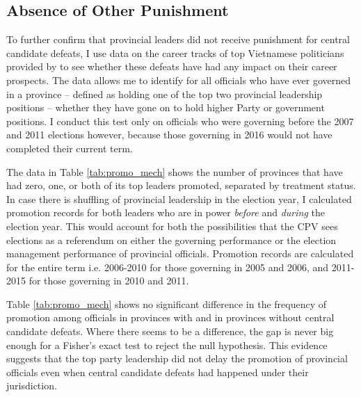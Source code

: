 \documentclass[12pt]{article}
\newcommand{\1}{\mathbbm{1}}
\begin{document}
\subsection{Absence of Other Punishment}

To further confirm that provincial leaders did not receive punishment for central candidate defeats, I use data on the career tracks of top Vietnamese politicians provided by \citet{MaleskyPhan2017} to see whether these defeats have had any impact on their career prospects. The data allows me to identify for all officials who have ever governed in a province -- defined as holding one of the top two provincial leadership positions -- whether they have gone on to hold higher Party or government positions. I conduct this test only on officials who were governing before the 2007 and 2011 elections however, because those governing in 2016 would not have completed their current term.

The data in Table \ref{tab:promo_mech} shows the number of provinces that have had zero, one, or both of its top leaders promoted, separated by treatment status. In case there is shuffling of provincial leadership in the election year, I calculated promotion records for both leaders who are in power \textit{before} and \textit{during} the election year. This would account for both the possibilities that the CPV sees elections as a referendum on either the governing performance or the election management performance of provincial officials. Promotion records are calculated for the entire term i.e. 2006-2010 for those governing in 2005 and 2006, and 2011-2015 for those governing in 2010 and 2011.



Table \ref{tab:promo_mech} shows no significant difference in the frequency of promotion among officials in provinces with and in provinces without central candidate defeats. Where there seems to be a difference, the gap is never big enough for a Fisher's exact test to reject the null hypothesis. This evidence suggests that the top party leadership did not delay the promotion of provincial officials even when central candidate defeats had happened under their jurisdiction.
\end{document}
